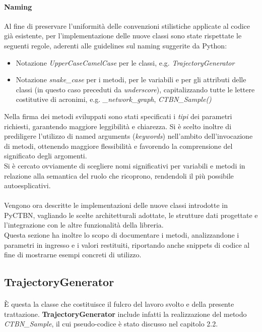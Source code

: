   \paragraph{Naming}
  Al fine di preservare l'uniformità delle convenzioni stilistiche applicate al codice
  già esistente, per l'implementazione delle nuove classi sono state rispettate le seguenti regole,
  aderenti alle guidelines sul naming suggerite da Python:
  \begin{itemize}
    \item Notazione \textit{UpperCaseCamelCase} per le classi, e.g. \textit{TrajectoryGenerator}
    \item Notazione \textit{snake\_case} per i metodi, per le variabili e per gli attributi delle classi 
      (in questo caso preceduti da \textit{underscore}), capitalizzando tutte le lettere 
      costitutive di acronimi, e.g. \textit{\_network\_graph}, \textit{CTBN\_Sample()}
  \end{itemize}
  Nella firma dei metodi sviluppati sono stati specificati i \textit{tipi} dei parametri richiesti,
  garantendo maggiore leggibilità e chiarezza. Si è scelto inoltre di prediligere
  l'utilizzo di named arguments (\textit{keywords}) nell'ambito dell'invocazione
  di metodi, ottenendo maggiore flessibilità e favorendo la comprensione del significato
  degli argomenti.\\
  Si è cercato ovviamente di scegliere nomi significativi per variabili e metodi
  in relazione alla semantica del ruolo che ricoprono, rendendoli il più possibile
  autoesplicativi. 

  \paragraph{}
  Vengono ora descritte le implementazioni delle nuove classi introdotte in PyCTBN,
  vagliando le scelte architetturali adottate, le strutture dati progettate e
  l'integrazione con le altre funzionalità della libreria.\\
  Questa sezione ha inoltre lo scopo di documentare i metodi, analizzandone i parametri
  in ingresso e i valori restituiti, riportando anche snippets di codice al fine di mostrarne
  esempi concreti di utilizzo.  
  
  \subsection{TrajectoryGenerator}
  \paragraph{}
  È questa la classe che costituisce il fulcro del lavoro svolto e della presente trattazione.
  \textbf{TrajectoryGenerator} include infatti la realizzazione del metodo 
  \textit{CTBN\_Sample}, il cui pseudo-codice è stato discusso nel capitolo 2.2.
  
